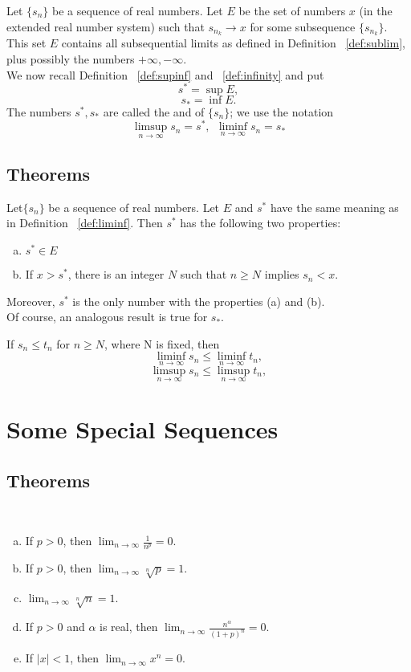 \begin{definition}\label{def:liminf}
	Let $\{s_n\}$ be a sequence of real numbers. Let $E$ be the set of numbers $x$ (in the extended real number system) such that $s_{n_k}\to x$ for some subsequence $\{s_{n_k}\}$. This set $E$ contains all subsequential limits as defined in Definition ~\ref{def:sublim}, plus possibly the numbers $+\infty, -\infty$.\\
	We now recall Definition ~\ref{def:supinf} and ~\ref{def:infinity} and put $$s^*=\sup E,$$ $$s_*=\inf E.$$ The numbers $s^*, s_*$ are called the {} and {} of $\{s_n\}$; we use the notation $$\limsup\limits_{n\rightarrow\infty}s_n=s^*,~~\liminf\limits_{n\rightarrow\infty}s_n=s_*$$
\end{definition}

\subsection{Theorems}
\begin{theorem}
	Let$\{s_n\}$ be a sequence of real numbers. Let $E$ and $s^*$ have the same meaning as in Definition ~\ref{def:liminf}. Then $s^*$ has the following two properties:
	\begin{enumerate}[(a)]
		\item $s^*\in E$
		\item If $x>s^*$, there is an integer $N$ such that $n\geq N$ implies $s_n<x$.
	\end{enumerate}
	Moreover, $s^*$ is the only number with the properties (a) and (b). \\
	Of course, an analogous result is true for $s_*$.
\end{theorem}

\begin{theorem}
	If $s_n\leq t_n$ for $n\geq N$, where N is fixed, then
	$$\liminf\limits_{n\rightarrow\infty}s_n\leq \liminf\limits_{n\rightarrow\infty}t_n,$$
	$$\limsup\limits_{n\rightarrow\infty}s_n\leq \limsup\limits_{n\rightarrow\infty}t_n,$$
\end{theorem}

\section{Some Special Sequences}
\subsection{Theorems}
\begin{theorem}
~
	\begin{enumerate}[(a)]
			\item If $p>0$, then $\lim_{n\to\infty}\frac{1}{n^p}=0$.
			\item If $p>0$, then $\lim_{n\to\infty}\sqrt[n] p=1$.
			\item $\lim_{n\to\infty} \sqrt[n]{n}=1.$
			\item If $p>0$ and $\alpha$ is real, then $\lim_{n\to\infty}\frac{n^\alpha}{(1+p)^n}=0$.
			\item If $|x|<1$, then $\lim_{n\to\infty}x^n=0$.
	\end{enumerate}
\end{theorem}

